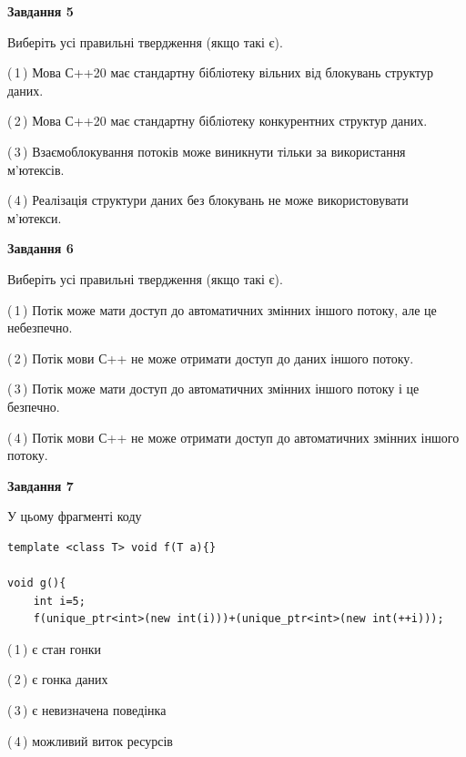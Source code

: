 \documentclass[12pt, ukrainian]{article}
\begin{document}
\begin {large}
{\begin{center}
\textbf{Завдання 5}
\end{center}

Виберіть усі правильні твердження (якщо такі є).\par
\vspace{2mm}

(\,1\,) Мова С++20 має стандартну бібліотеку вільних від блокувань структур даних.%

(\,2\,) Мова С++20 має стандартну бібліотеку конкурентних структур даних.%

(\,3\,) Взаємоблокування потоків може виникнути тільки за використання м’ютексів.%

(\,4\,) Реалізація структури даних без блокувань не може використовувати м’ютекси.%
\newpage


\begin{center}
\textbf{Завдання 6}
\end{center}

Виберіть усі правильні твердження (якщо такі є).\par
\vspace{2mm}

(\,1\,) Потік може мати доступ до автоматичних змінних іншого потоку, але це небезпечно.%

(\,2\,) Потік мови С++ не може отримати доступ до даних іншого потоку.%

(\,3\,) Потік може мати доступ до автоматичних змінних іншого потоку і це безпечно.%

(\,4\,) Потік мови С++ не може отримати доступ до автоматичних змінних іншого потоку.%


\begin{center}
\textbf{Завдання 7}
\end{center}

У цьому фрагменті коду
\begin{verbatim}
template <class T> void f(T a){}

void g(){
    int i=5;
    f(unique_ptr<int>(new int(i)))+(unique_ptr<int>(new int(++i)));
\end{verbatim}
(\,1\,) є стан гонки%

(\,2\,) є гонка даних%

(\,3\,) є невизначена поведінка%

(\,4\,) можливий виток ресурсів%

}
\end {large}

\vspace{4mm}
\newpage
\end{document}
